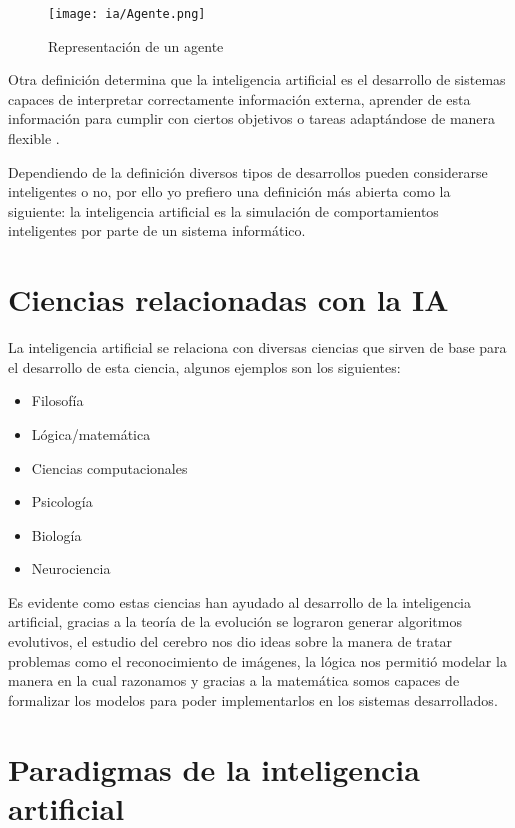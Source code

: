 \documentclass[11pt,fleqn]{book} %
\begin{document}
\begin{figure}[ht]
\centering\texttt{[image: ia/Agente.png]}
\caption{Representación de un agente}
\label{fig:agente} 
\end{figure}

Otra definición determina que la inteligencia artificial es el desarrollo de sistemas capaces de interpretar correctamente información externa, aprender de esta información para cumplir con ciertos objetivos o tareas adaptándose de manera flexible \cite{KAPLAN201915}.

Dependiendo de la definición diversos tipos de desarrollos pueden considerarse inteligentes o no, por ello yo prefiero una definición más abierta como la siguiente: la inteligencia artificial es la simulación de comportamientos inteligentes por parte de un sistema informático.

\section{Ciencias relacionadas con la IA} 
La inteligencia artificial se relaciona con diversas ciencias que sirven de base para el desarrollo de esta ciencia, algunos ejemplos son los siguientes:

\begin{itemize}
\item Filosofía
\item Lógica/matemática
\item Ciencias computacionales
\item Psicología
\item Biología
\item Neurociencia
\end{itemize}

Es evidente como estas ciencias han ayudado al desarrollo de la inteligencia artificial, gracias a la teoría de la evolución se lograron generar algoritmos evolutivos, el estudio del cerebro nos dio ideas sobre la manera de tratar problemas como el reconocimiento de imágenes, la lógica nos permitió modelar la manera en la cual razonamos y gracias a la matemática somos capaces de formalizar los modelos para poder implementarlos en los sistemas desarrollados.

\section{Paradigmas de la inteligencia artificial} 
\end{document}
